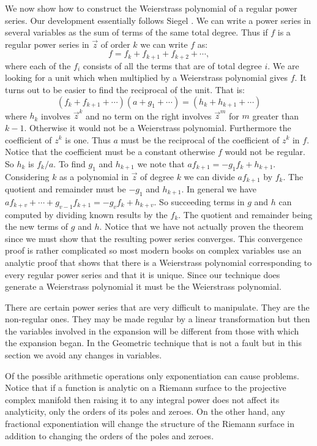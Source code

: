 We now show how to construct the Weierstrass polynomial of a regular
power series.  Our development essentially follows Siegel
\cite{Siegel:Analysis}.  We can write a power series in several
variables as the sum of terms of the same total degree.  Thus if $f$
is a regular power series in $\vec z$ of order $k$ we can write $f$
as:
\[
f = f_k + f_{k+1} + f_{k+2} + \cdots,
\]
where each of the $f_i$ consists of all the terms that are of total degree
$i$.  We are looking for a unit which when multiplied by a Weierstrass
polynomial gives $f$.  It turns out to be easier to find the reciprocal
of the unit.  That is: 
\[
(f_k + f_{k+1} + \cdots) (a + g_1 + \cdots) = (h_k + h_{k+1} + \cdots)
\]
where $h_k$ involves ${\vec z}^k$ and no term on the right involves
${\vec z}^m$ for $m$ greater than $k - 1$. Otherwise it would not be a
Weierstrass polynomial.  Furthermore the coefficient of $z^k$ is one.
Thus $a$ must be the reciprocal of the coefficient of $z^k$ in $f$.
Notice that the coefficient must be a constant otherwise $f$ would not
be regular.  So $h_k$ is $f_k / a$.  To find $g_1$ and $h_{k+1}$ we
note that $a f_{k+1} = - g_1 f_k + h_{k+1}.$ Considering $k$ as a
polynomial in $\vec z$ of degree $k$ we can divide $a f_{k+1}$ by
$f_k$.  The quotient and remainder must be $-g_1$ and $h_{k+1}$.  In
general we have $a f_{k+v} + \cdots + g_{v-1} f_{k+1} = - g_v f_k +
h_{k+v}.$ So succeeding terms in $g$ and $h$ can computed by dividing
known results by the $f_k$.  The quotient and remainder being the new
terms of $g$ and $h$.  Notice that we have not actually proven the
theorem since we must show that the resulting power series converges.
This convergence proof is rather complicated so most modern books on
complex variables use an analytic proof that shows that there is a
Weierstrass polynomial corresponding to every regular power series and
that it is unique.  Since our technique does generate a Weierstrass
polynomial it must be the Weierstrass polynomial.

There are certain power series that are very difficult to manipulate.
They are the non-regular ones.  They may be made regular by a linear
transformation but then the variables involved in the expansion will
be different from those with which the expansion began.  In the
Geometric technique that is not a fault but in this section we avoid
any changes in variables.

Of the possible arithmetic operations only exponentiation can cause
problems.  Notice that if a function is analytic on a Riemann surface
to the projective complex manifold then raising it to any integral
power does not affect its analyticity, only the orders of its poles
and zeroes.  On the other hand, any fractional exponentiation will
change the structure of the Riemann surface in addition to changing
the orders of the poles and zeroes.

